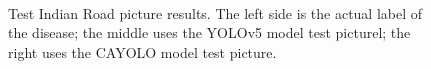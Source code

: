 \documentclass[sensors,article,submit,moreauthors]{Definitions/mdpi}
\begin{document}
\begin{figure}[H]
{\begin{minipage}{0.9\textwidth}
            \end{minipage}}\\

        \captionsetup[subfloat]{labelformat=parens}
        \caption{Test Indian Road picture results. The left side is the actual label of the disease; the middle uses the YOLOv5 model test picturel; the right uses the CAYOLO model test picture.\label{fig:12}}
    \end{figure}
\end{document}
